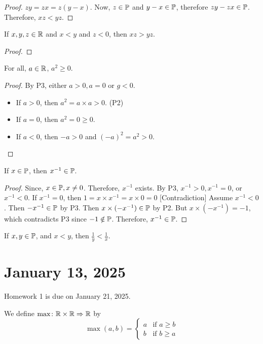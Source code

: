 \documentclass[11pt]{article}
\begin{document}
\begin{proof}
    \(zy = zx = z(y - x) \). Now, \(z \in \mathbb P\) and \(y - x \in \mathbb P\), therefore \(zy - zx \in \mathbb P\). Therefore, \(xz < yz\).
\end{proof}
\begin{corollary}
    If \(x, y, z \in \mathbb R\) and \(x < y\) and \(z < 0\), then \(xz > yz\).
\end{corollary}
\begin{proof}

\end{proof}
\begin{corollary}
    For all, \(a \in \mathbb R\), \(a^2 \geq 0\).
\end{corollary}
\begin{proof}
    By P3, either \(a > 0, a = 0\) or \(g < 0\).
    \begin{itemize}
        \item If \(a > 0\), then \(a^2 = a \times a > 0\). \hfill(P2)
        \item If \(a = 0\), then \(a^2 = 0 \geq 0\).
        \item If \(a < 0\), then \(-a > 0\) and \((-a)^2 = a^2 > 0\).
    \end{itemize}
\end{proof}

\begin{proposition}
    If \(x \in \mathbb P\), then \(x^{-1} \in \mathbb P \).
\end{proposition}
\begin{proof}
    Since, \(x \in \mathbb P, x \neq 0\). Therefore, \(x^{-1}\) exists. By P3, \(x^{-1} > 0, x^{-1} = 0  \), or \(x^{-1} < 0\).
    If \(x^{-1} = 0\), then \(1 = x \times x^{-1} = x \times 0 = 0\)
    [Contradiction] Assume \(x^{-1} < 0\). Then \(-x^{-1} \in \mathbb P\) by P3. Then \(x
    \times (-x^{-1}) \in \mathbb P\) by P2. But \(x \times (-x^{-1}) = -1\), which
    contradicts P3 since \(-1 \notin \mathbb P\). Therefore, \(x^{-1} \in \mathbb P\).
\end{proof}
\begin{corollary}
    If \(x, y \in \mathbb P\), and \(x < y\), then \(\frac{1}{y} < \frac{1}{x}\).
\end{corollary}

\section{January 13, 2025}
Homework 1 is due on January 21, 2025.\\
\begin{definition}
    We define \(\max \colon \mathbb R \times \mathbb R \Rightarrow \mathbb R\) by \[\max(a, b) = \begin{cases}
            a & \text{if } a \geq b \\
            b & \text{if } b \geq a
        \end{cases}\]
\end{definition}
\end{document}
